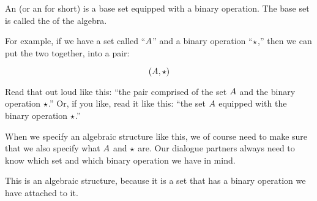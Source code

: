 \documentclass[../../../main.tex]{subfiles}
\begin{document}
\begin{terminology}
  An  (or an  for short) is a base set equipped with a binary operation. The base set is called the  of the algebra.
\end{terminology}

For example, if we have a set called ``$A$'' and a binary operation ``$\opSymbol/$,'' then we can put the two together, into a pair:

\begin{equation*}
  (\set{A}, \opSymbol/)
\end{equation*}

Read that out loud like this: ``the pair comprised of the set $A$ and the binary operation $\opSymbol/$.'' Or, if you like, read it like this: ``the set $A$ equipped with the binary operation $\opSymbol/$.''

\begin{aside}
  \begin{remark}
    When we specify an algebraic structure like this, we of course need to make sure that we also specify what $A$ and $\opSymbol/$ are. Our dialogue partners always need to know which set and which binary operation we have in mind.
  \end{remark}
\end{aside}

This is an algebraic structure, because it is a set that has a binary operation we have attached to it.
\end{document}
